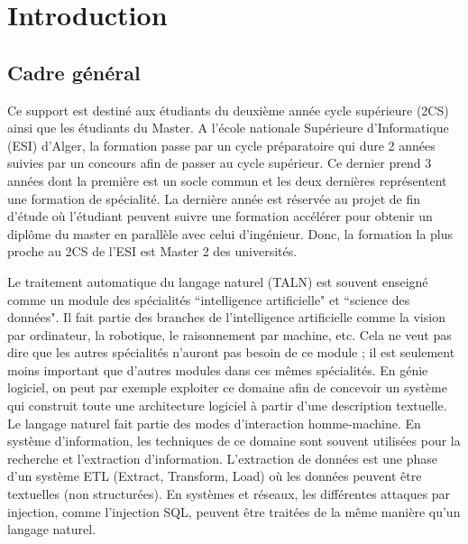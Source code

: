 \documentclass{KodeBook}
\begin{document}
		\mainmatter
	
\fi

\chapter*{Introduction}


\section*{Cadre général}

Ce support est destiné aux étudiants du deuxième année cycle supérieure (2CS) ainsi que les étudiants du Master.
A l'école nationale Supérieure d'Informatique (ESI) d'Alger, la formation passe par un cycle préparatoire qui dure
2 années suivies par un concours afin de passer au cycle supérieur.
Ce dernier prend 3 années dont la première est un socle commun et les deux dernières représentent une formation de spécialité.
La dernière année est réservée au projet de fin d'étude où l'étudiant peuvent suivre une formation accélérer pour obtenir un diplôme du master en parallèle avec celui d'ingénieur.
Donc, la formation la plus proche au 2CS de l'ESI est Master 2 des universités.

Le traitement automatique du langage naturel (TALN) est souvent enseigné comme un module des spécialités ``intelligence artificielle" et ``science des données".
Il fait partie des branches de l'intelligence artificielle comme la vision par ordinateur, la robotique, le raisonnement par machine, etc.
Cela ne veut pas dire que les autres spécialités n'auront pas besoin de ce module ; il est seulement moins important que d'autres modules dans ces mêmes spécialités.
En génie logiciel, on peut par exemple exploiter ce domaine afin de concevoir un système qui construit toute une architecture logiciel à partir d'une description textuelle.
Le langage naturel fait partie des modes d'interaction homme-machine.
En système d'information, les techniques de ce domaine sont souvent utilisées pour la recherche et l'extraction d'information.
L'extraction de données est une phase d'un système ETL (Extract, Transform, Load) où les données peuvent être textuelles (non structurées).
En systèmes et réseaux, les différentes attaques par injection, comme l'injection SQL, peuvent être traitées de la même manière qu'un langage naturel.
\end{document}
